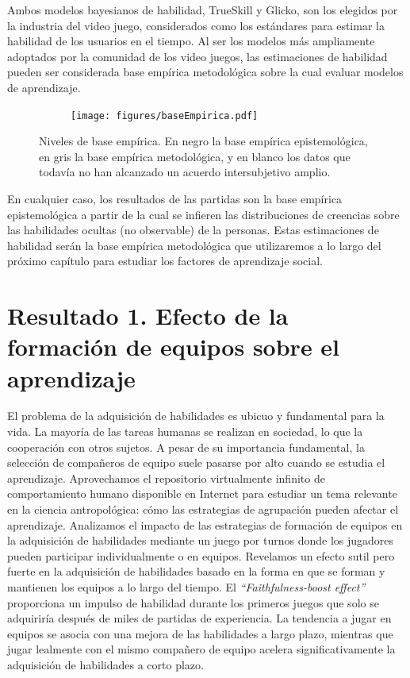 \documentclass[a4paper,11pt]{book}
\theoremstyle{definition}
\begin{document}
Ambos modelos bayesianos de habilidad, TrueSkill y Glicko, son los elegidos por la industria del video juego, considerados como los estándares para estimar la habilidad de los usuarios en el tiempo.
%
Al ser los modelos más ampliamente adoptados por la comunidad de los video juegos, las estimaciones de habilidad pueden ser considerada base empírica metodológica sobre la cual evaluar modelos de aprendizaje.
\begin{figure}[ht!]
    \centering
    \begin{subfigure}[b]{0.45\textwidth}
    \texttt{[image: figures/baseEmpirica.pdf]}
    \end{subfigure}
    \caption{Niveles de base empírica. En negro la base empírica epistemológica, en gris la base empírica metodológica, y en blanco los datos que todavía no han alcanzado un acuerdo intersubjetivo amplio.}
\end{figure}
%
En cualquier caso, los resultados de las partidas son la base empírica epistemológica a partir de la cual se infieren las distribuciones de creencias sobre las habilidades ocultas (no observable) de la personas.
%
Estas estimaciones de habilidad serán la base empírica metodológica que utilizaremos a lo largo del próximo capítulo para estudiar los factores de aprendizaje social.







\chapter{Resultado 1. Efecto de la formación de equipos sobre el aprendizaje}\label{ch:team}

El problema de la adquisición de habilidades es ubicuo y fundamental para la vida.
%
La mayoría de las tareas humanas se realizan en sociedad, lo que  la cooperación con otros sujetos.
%
A pesar de su importancia fundamental, la selección de compañeros de equipo suele pasarse por alto cuando se estudia el aprendizaje.
%
Aprovechamos el repositorio virtualmente infinito de comportamiento humano disponible en Internet para estudiar un tema relevante en la ciencia antropológica: cómo las estrategias de agrupación pueden afectar el aprendizaje.
%
Analizamos el impacto de las estrategias de formación de equipos en la adquisición de habilidades mediante un juego por turnos donde los jugadores pueden participar individualmente o en equipos.
%
Revelamos un efecto sutil pero fuerte en la adquisición de habilidades basado en la forma en que se forman y mantienen los equipos a lo largo del tiempo.
%
El \emph{``Faithfulness-boost effect''} proporciona un impulso de habilidad durante los primeros juegos que solo se adquiriría después de miles de partidas de experiencia.
%
La tendencia a jugar en equipos se asocia con una mejora de las habilidades a largo plazo, mientras que jugar lealmente con el mismo compañero de equipo acelera significativamente la adquisición de habilidades a corto plazo.
\end{document}

